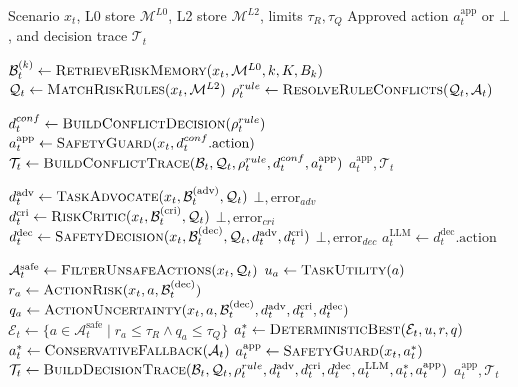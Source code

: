 \documentclass[10pt]{article}
\begin{document}
\begin{algorithm}[t]
\caption{Overall Risk-aware Decision Procedure}
\label{alg:overall-decision}
\small
\begin{algorithmic}[1]
\Require Scenario $x_t$, L0 store $\mathcal{M}^{L0}$,
         L2 store $\mathcal{M}^{L2}$, limits $\tau_R,\tau_Q$
\Ensure Approved action $a_t^{\mathrm{app}}$ or $\bot$,
        and decision trace $\mathcal{T}_t$

    \State $\mathcal{B}_t^{(k)} \gets
    \Call{RetrieveRiskMemory}{x_t,\mathcal{M}^{L0},k,K,B_k}$
\EndFor
\State $\mathcal{Q}_t \gets
\Call{MatchRiskRules}{x_t,\mathcal{M}^{L2}}$
\State $\rho_t^{rule} \gets
\Call{ResolveRuleConflicts}{\mathcal{Q}_t,\mathcal{A}_t}$

    \State $d_t^{conf} \gets \Call{BuildConflictDecision}{\rho_t^{rule}}$
    \State $a_t^{\mathrm{app}} \gets
    \Call{SafetyGuard}{x_t,d_t^{conf}.\mathrm{action}}$
    \State $\mathcal{T}_t \gets
    \Call{BuildConflictTrace}{\mathcal{B}_t,\mathcal{Q}_t,
    \rho_t^{rule},d_t^{conf},a_t^{\mathrm{app}}}$
    \State \Return $a_t^{\mathrm{app}},\mathcal{T}_t$
\EndIf

\State $d_t^{\mathrm{adv}} \gets
\Call{TaskAdvocate}{x_t,\mathcal{B}_t^{(\mathrm{adv})},\mathcal{Q}_t}$
    \State \Return $\bot,\mathrm{error}_{adv}$
\EndIf
\State $d_t^{\mathrm{cri}} \gets
\Call{RiskCritic}{x_t,\mathcal{B}_t^{(\mathrm{cri})},\mathcal{Q}_t}$
    \State \Return $\bot,\mathrm{error}_{cri}$
\EndIf
\State $d_t^{\mathrm{dec}} \gets
\Call{SafetyDecision}{x_t,\mathcal{B}_t^{(\mathrm{dec})},\mathcal{Q}_t,
d_t^{\mathrm{adv}},d_t^{\mathrm{cri}}}$
    \State \Return $\bot,\mathrm{error}_{dec}$
\EndIf
\State $a_t^{\mathrm{LLM}} \gets d_t^{\mathrm{dec}}.\mathrm{action}$

\State $\mathcal{A}_t^{\mathrm{safe}} \gets
\Call{FilterUnsafeActions}{x_t,\mathcal{Q}_t}$
    \State $u_a\gets\Call{TaskUtility}{a}$
    \State $r_a\gets\Call{ActionRisk}{x_t,a,\mathcal{B}_t^{(\mathrm{dec})}}$
    \State $q_a\gets\Call{ActionUncertainty}{x_t,a,
    \mathcal{B}_t^{(\mathrm{dec})},d_t^{\mathrm{adv}},d_t^{\mathrm{cri}},
    d_t^{\mathrm{dec}}}$
\EndFor
\State $\mathcal{E}_t\gets\{a\in\mathcal{A}_t^{\mathrm{safe}}\mid
r_a\le\tau_R\land q_a\le\tau_Q\}$
    \State $a_t^*\gets\Call{DeterministicBest}{\mathcal{E}_t,u,r,q}$
\Else
    \State $a_t^*\gets\Call{ConservativeFallback}{\mathcal{A}_t}$
\EndIf
\State $a_t^{\mathrm{app}}\gets\Call{SafetyGuard}{x_t,a_t^*}$
\State $\mathcal{T}_t\gets
\Call{BuildDecisionTrace}{\mathcal{B}_t,\mathcal{Q}_t,\rho_t^{rule},
d_t^{\mathrm{adv}},d_t^{\mathrm{cri}},d_t^{\mathrm{dec}},
a_t^{\mathrm{LLM}},a_t^*,a_t^{\mathrm{app}}}$
\State \Return $a_t^{\mathrm{app}},\mathcal{T}_t$
\end{algorithmic}
\end{algorithm}
\end{document}
